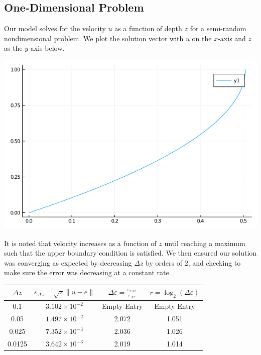 \documentclass[11pt]{article}
\begin{document}
	\subsection{One-Dimensional Problem}
	Our model solves for the velocity $ u $ as a function of depth $ z $ for a semi-random nondimensional problem. We plot the solution vector with $ u $ on the $ x $-axis and $ z $ as the $ y $-axis below.
	\begin{center}
		\includegraphics[scale=0.5]{1D_low_res.png}
	\end{center}
	It is noted that velocity increases as a function of $ z $ until reaching a maximum such that the upper boundary condition is satisfied.
	\newline\indent
	We then ensured our solution was converging as expected by decreasing $ \Delta z $ by orders of 2, and checking to make sure the error was decreasing at a constant rate.
	\begin{center}
		\renewcommand{\arraystretch}{2.0}
		\begin{tabular}{c|c|c|c}
			\hline\hline
			$\displaystyle \Delta z $&$\displaystyle \varepsilon_{\Delta z} = \sqrt{z}\lVert u-e\rVert $&$ \displaystyle \Delta\varepsilon = \frac{\varepsilon_{2\Delta z}}{\varepsilon_{\Delta z}} $&$\displaystyle r = \log_2\left(\Delta\varepsilon\right) $\\
			\hline
			0.1&$3.102\times 10^{-2}$&Empty Entry&Empty Entry\\
			0.05&$1.497\times 10^{-2}$&2.072&1.051\\
			0.025&$7.352\times 10^{-3}$&2.036&1.026\\
			0.0125&$3.642\times 10^{-3}$&2.019&1.014\\
			\hline
		\end{tabular}
	\end{center}
\end{document}
